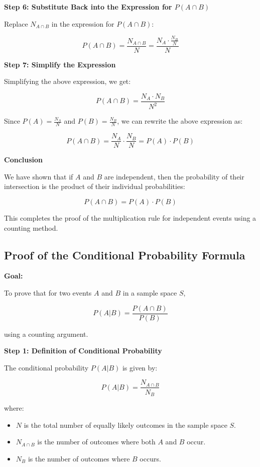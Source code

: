 \documentclass{article}
\begin{document}
\textbf{Step 6: Substitute Back into the Expression for \( P(A \cap B) \)}

Replace \( N_{A \cap B} \) in the expression for \( P(A \cap B) \):

\[
P(A \cap B) = \frac{N_{A \cap B}}{N} = \frac{N_A \cdot \frac{N_B}{N}}{N}
\]

\textbf{Step 7: Simplify the Expression}

Simplifying the above expression, we get:

\[
P(A \cap B) = \frac{N_A \cdot N_B}{N^2}
\]

Since \( P(A) = \frac{N_A}{N} \) and \( P(B) = \frac{N_B}{N} \), we can rewrite the above expression as:

\[
P(A \cap B) = \frac{N_A}{N} \cdot \frac{N_B}{N} = P(A) \cdot P(B)
\]

\textbf{Conclusion}

We have shown that if \( A \) and \( B \) are independent, then the probability of their intersection is the product of their individual probabilities:

\[
P(A \cap B) = P(A) \cdot P(B)
\]

This completes the proof of the multiplication rule for independent events using a counting method.

\subsection*{Proof of the Conditional Probability Formula}

\textbf{Goal:}

To prove that for two events \( A \) and \( B \) in a sample space \( S \),

\[ P(A|B) = \frac{P(A \cap B)}{P(B)} \]

using a counting argument.

\textbf{Step 1: Definition of Conditional Probability}

The conditional probability \( P(A|B) \) is given by:

\[
P(A|B) = \frac{N_{A \cap B}}{N_B}
\]

where:
\begin{itemize}
    \item \( N \) is the total number of equally likely outcomes in the sample space \( S \).
    \item \( N_{A \cap B} \) is the number of outcomes where both \( A \) and \( B \) occur.
    \item \( N_B \) is the number of outcomes where \( B \) occurs.
\end{itemize}
\end{document}
